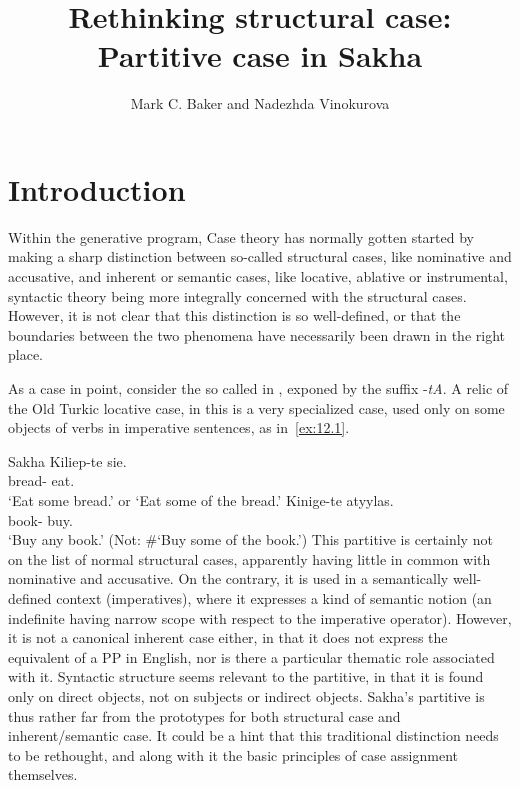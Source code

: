 \documentclass[output=paper]{langsci/langscibook}
\author{Mark C. Baker\affiliation{Rutgers University} and Nadezhda Vinokurova\affiliation{Institute for Humanities Research and Indigenous Studies of the North, Siberian Branch, Russian Academy of Sciences}}
\title{Rethinking structural case: Partitive case in Sakha}
\begin{document}
\glsresetall
\maketitle

\section{Introduction}

Within the generative program, Case theory has normally gotten started by
making a sharp distinction between so-called structural cases, like nominative
and accusative, and inherent or semantic
cases, like locative, ablative or
instrumental, syntactic theory being more integrally concerned with the
structural cases. However, it is not clear that this distinction is so
well-defined, or that the boundaries between the two phenomena have necessarily
been drawn in the right place.

As a case in point, consider the so called  in , exponed by
the suffix -\emph{tA}. A relic of the Old Turkic locative case, in  this
is a very specialized case, used only on some objects of verbs in imperative
sentences, as in~\eqref{ex:12.1}.

\ea\label{ex:12.1}Sakha \parencite[421, 429]{StachowskiMenz1998}
	\ea
		\gll Kiliep-te  sie.\\
			bread-\Part{}  eat.\Imp{}\\
		\glt ‘Eat some bread.’ or ‘Eat some of the bread.’
	\ex
		\gll Kinige-te  atyylas.\\
			book-\Part{}  buy.\Imp{}\\
		\glt ‘Buy any book.’  (Not: \#‘Buy some of the book.’)
	\z
\z
This partitive is certainly not on the list of normal
structural cases, apparently having little in common with nominative and
accusative. On the contrary, it is used in a semantically
well-defined context (imperatives), where it expresses a kind of semantic
notion (an indefinite having narrow scope with respect to the
imperative operator). However, it is not a canonical
inherent
case either, in that it does not express the equivalent of a PP in English, nor
is there a particular thematic role associated with it. Syntactic structure
seems relevant to the partitive, in that it is found only on
direct objects, not on subjects or indirect objects. Sakha’s
partitive is thus rather far from the prototypes for both
structural case and inherent/semantic case. It could be a hint that this
traditional distinction needs to be rethought, and along with it the basic
principles of case assignment themselves.
\end{document}
